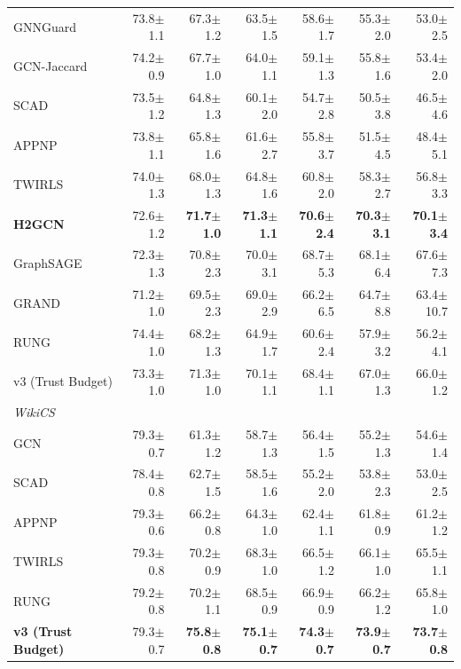 \documentclass{article}
\newcommand{\score}[2]{#1{\scriptsize$\pm$#2}}
\begin{document}
\begin{center}
\begin{tabular}{lrrrrrr}
GNNGuard       & \score{73.8}{1.1} & \score{67.3}{1.2} & \score{63.5}{1.5} & \score{58.6}{1.7} & \score{55.3}{2.0} & \score{53.0}{2.5} \\
GCN-Jaccard    & \score{74.2}{0.9} & \score{67.7}{1.0} & \score{64.0}{1.1} & \score{59.1}{1.3} & \score{55.8}{1.6} & \score{53.4}{2.0} \\
SCAD           & \score{73.5}{1.2} & \score{64.8}{1.3} & \score{60.1}{2.0} & \score{54.7}{2.8} & \score{50.5}{3.8} & \score{46.5}{4.6} \\
APPNP          & \score{73.8}{1.1} & \score{65.8}{1.6} & \score{61.6}{2.7} & \score{55.8}{3.7} & \score{51.5}{4.5} & \score{48.4}{5.1} \\
TWIRLS         & \score{74.0}{1.3} & \score{68.0}{1.3} & \score{64.8}{1.6} & \score{60.8}{2.0} & \score{58.3}{2.7} & \score{56.8}{3.3} \\
\textbf{H2GCN} & \score{72.6}{1.2} & \textbf{\score{71.7}{1.0}} & \textbf{\score{71.3}{1.1}} & \textbf{\score{70.6}{2.4}} & \textbf{\score{70.3}{3.1}} & \textbf{\score{70.1}{3.4}} \\
GraphSAGE      & \score{72.3}{1.3} & \score{70.8}{2.3} & \score{70.0}{3.1} & \score{68.7}{5.3} & \score{68.1}{6.4} & \score{67.6}{7.3} \\
GRAND          & \score{71.2}{1.0} & \score{69.5}{2.3} & \score{69.0}{2.9} & \score{66.2}{6.5} & \score{64.7}{8.8} & \score{63.4}{10.7} \\
RUNG           & \score{74.4}{1.0} & \score{68.2}{1.3} & \score{64.9}{1.7} & \score{60.6}{2.4} & \score{57.9}{3.2} & \score{56.2}{4.1} \\
v3 (Trust Budget) & \score{73.3}{1.0} & \score{71.3}{1.0} & \score{70.1}{1.1} & \score{68.4}{1.1} & \score{67.0}{1.3} & \score{66.0}{1.2} \\
\midrule
\multicolumn{7}{l}{\textit{WikiCS}} \\
\midrule
GCN            & \score{79.3}{0.7} & \score{61.3}{1.2} & \score{58.7}{1.3} & \score{56.4}{1.5} & \score{55.2}{1.3} & \score{54.6}{1.4} \\
SCAD           & \score{78.4}{0.8} & \score{62.7}{1.5} & \score{58.5}{1.6} & \score{55.2}{2.0} & \score{53.8}{2.3} & \score{53.0}{2.5} \\
APPNP          & \score{79.3}{0.6} & \score{66.2}{0.8} & \score{64.3}{1.0} & \score{62.4}{1.1} & \score{61.8}{0.9} & \score{61.2}{1.2} \\
TWIRLS         & \score{79.3}{0.8} & \score{70.2}{0.9} & \score{68.3}{1.0} & \score{66.5}{1.2} & \score{66.1}{1.0} & \score{65.5}{1.1} \\
RUNG           & \score{79.2}{0.8} & \score{70.2}{1.1} & \score{68.5}{0.9} & \score{66.9}{0.9} & \score{66.2}{1.2} & \score{65.8}{1.0} \\
\textbf{v3 (Trust Budget)} & \score{79.3}{0.7} & \textbf{\score{75.8}{0.8}} & \textbf{\score{75.1}{0.7}} & \textbf{\score{74.3}{0.7}} & \textbf{\score{73.9}{0.7}} & \textbf{\score{73.7}{0.8}} \\
\bottomrule
\end{tabular}
\end{center}
\end{document}
